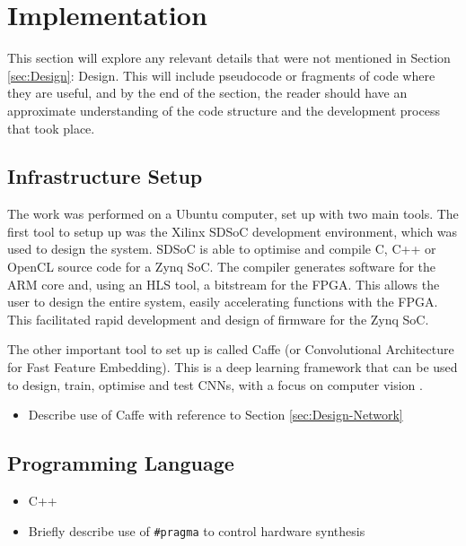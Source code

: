 \documentclass[12pt]{article}
\begin{document}
\newpage

\section{Implementation}
\label{sec:Imp}
\vspace{-12pt}

This section will explore any relevant details that were not mentioned in Section \ref{sec:Design}: Design. This will include pseudocode or fragments of code where they are useful, and by the end of the section, the reader should have an approximate understanding of the code structure and the development process that took place.

\subsection{Infrastructure Setup}
\label{sec:Imp-InfSetup}
\vspace{-12pt}

The work was performed on a Ubuntu computer, set up with two main tools. The first tool to setup up was the Xilinx SDSoC development environment, which was used to design the system. SDSoC is able to optimise and compile C, C++ or OpenCL source code for a Zynq SoC. The compiler generates software for the ARM core and, using an HLS tool, a bitstream for the FPGA. This allows the user to design the entire system, easily accelerating functions with the FPGA. This facilitated rapid development and design of firmware for the Zynq SoC.

The other important tool to set up is called Caffe (or Convolutional Architecture for Fast Feature Embedding). This is a deep learning framework that can be used to design, train, optimise and test CNNs, with a focus on computer vision \cite{jia2014caffe}.
\begin{itemize}
\item Describe use of Caffe with reference to Section \ref{sec:Design-Network}
\end{itemize}

\subsection{Programming Language}
\label{sec:Imp-Language}
\vspace{-12pt}

\begin{itemize}
\item C++
\item Briefly describe use of  \verb|#pragma| to control hardware synthesis
\end{itemize}
\end{document}
